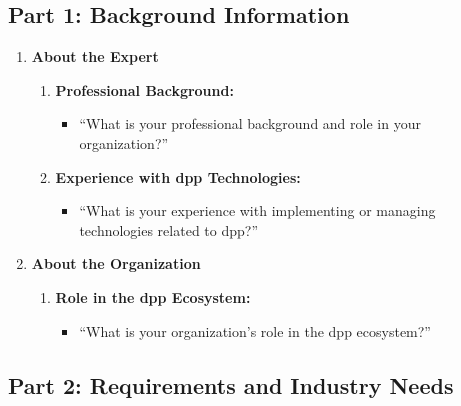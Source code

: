 \subsection*{Part 1: Background Information}
\begin{enumerate}
    \item \textbf{About the Expert}
    \begin{enumerate}
        \item \textbf{Professional Background:} 
        \begin{itemize}
            \item ``What is your professional background and role in your organization?''
        \end{itemize}
        \item \textbf{Experience with \ac{dpp} Technologies:}
        \begin{itemize}
            \item ``What is your experience with implementing or managing technologies related to \ac{dpp}?''
        \end{itemize}
    \end{enumerate}

    \item \textbf{About the Organization}
    \begin{enumerate}
        \item \textbf{Role in the \ac{dpp} Ecosystem:}
        \begin{itemize}
            \item ``What is your organization’s role in the \ac{dpp} ecosystem?''
        \end{itemize}
    \end{enumerate}
\end{enumerate}

\subsection*{Part 2: Requirements and Industry Needs}

